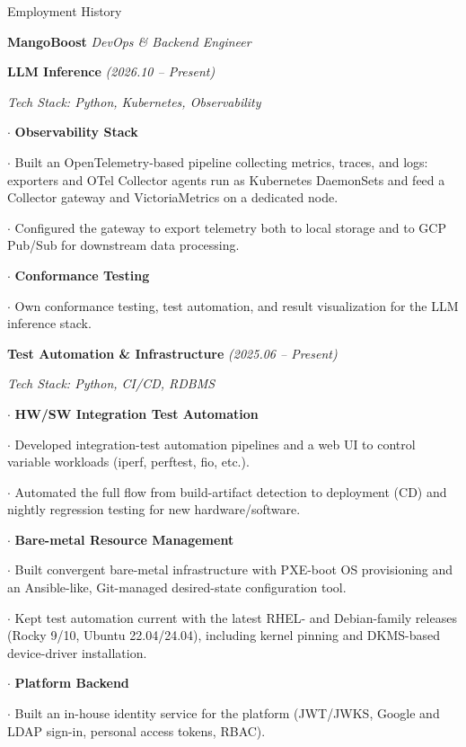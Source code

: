 \begin{rubric}{Employment History}

\entry*[2025.06 -- Present]%
	\textbf{MangoBoost} \enspace\emph{DevOps \& Backend Engineer}\par

	\quad \textbf{LLM Inference} \textit{\small(2026.10 -- Present)}\par
	\textit{\small Tech Stack: Python, Kubernetes, Observability}\par
	\quad $\cdot$ \textbf{Observability Stack}\par
	\hangindent=1cm  %
	$\cdot$ Built an OpenTelemetry-based pipeline collecting metrics, traces, and logs: exporters and OTel Collector agents run as Kubernetes DaemonSets and feed a Collector gateway and VictoriaMetrics on a dedicated node.\par
	\hangindent=1cm  %
	$\cdot$ Configured the gateway to export telemetry both to local storage and to GCP Pub/Sub for downstream data processing.\par
	\quad $\cdot$ \textbf{Conformance Testing}\par
	\hangindent=1cm  %
	$\cdot$ Own conformance testing, test automation, and result visualization for the LLM inference stack.\par

	\quad \textbf{Test Automation \& Infrastructure} \textit{\small(2025.06 -- Present)}\par
	\textit{\small Tech Stack: Python, CI/CD, RDBMS}\par
	\quad $\cdot$ \textbf{HW/SW Integration Test Automation}\par
	\hangindent=1cm  %
	$\cdot$ Developed integration-test automation pipelines and a web UI to control variable workloads (iperf, perftest, fio, etc.).\par
	\hangindent=1cm  %
	$\cdot$ Automated the full flow from build-artifact detection to deployment (CD) and nightly regression testing for new hardware/software.\par
	\quad $\cdot$ \textbf{Bare-metal Resource Management}\par
	\hangindent=1cm  %
	$\cdot$ Built convergent bare-metal infrastructure with PXE-boot OS provisioning and an Ansible-like, Git-managed desired-state configuration tool.\par
	\hangindent=1cm  %
	$\cdot$ Kept test automation current with the latest RHEL- and Debian-family releases (Rocky 9/10, Ubuntu 22.04/24.04), including kernel pinning and DKMS-based device-driver installation.\par
	\quad $\cdot$ \textbf{Platform Backend}\par
	\hangindent=1cm  %
	$\cdot$ Built an in-house identity service for the platform (JWT/JWKS, Google and LDAP sign-in, personal access tokens, RBAC).\par


\end{rubric}
